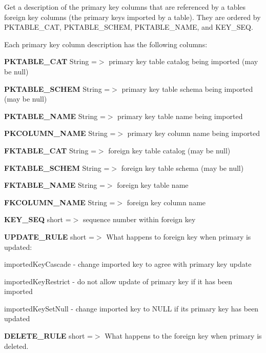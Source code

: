Get a description of the primary key columns that are referenced by a table\textquotesingle{}s foreign key columns (the primary keys imported by a table). They are ordered by P\+K\+T\+A\+B\+L\+E\+\_\+\+C\+AT, P\+K\+T\+A\+B\+L\+E\+\_\+\+S\+C\+H\+EM, P\+K\+T\+A\+B\+L\+E\+\_\+\+N\+A\+ME, and K\+E\+Y\+\_\+\+S\+EQ. 

Each primary key column description has the following columns\+: 
\begin{DoxyEnumerate}
\item {\bfseries P\+K\+T\+A\+B\+L\+E\+\_\+\+C\+AT} String =$>$ primary key table catalog being imported (may be null) 
\item {\bfseries P\+K\+T\+A\+B\+L\+E\+\_\+\+S\+C\+H\+EM} String =$>$ primary key table schema being imported (may be null) 
\item {\bfseries P\+K\+T\+A\+B\+L\+E\+\_\+\+N\+A\+ME} String =$>$ primary key table name being imported 
\item {\bfseries P\+K\+C\+O\+L\+U\+M\+N\+\_\+\+N\+A\+ME} String =$>$ primary key column name being imported 
\item {\bfseries F\+K\+T\+A\+B\+L\+E\+\_\+\+C\+AT} String =$>$ foreign key table catalog (may be null) 
\item {\bfseries F\+K\+T\+A\+B\+L\+E\+\_\+\+S\+C\+H\+EM} String =$>$ foreign key table schema (may be null) 
\item {\bfseries F\+K\+T\+A\+B\+L\+E\+\_\+\+N\+A\+ME} String =$>$ foreign key table name 
\item {\bfseries F\+K\+C\+O\+L\+U\+M\+N\+\_\+\+N\+A\+ME} String =$>$ foreign key column name 
\item {\bfseries K\+E\+Y\+\_\+\+S\+EQ} short =$>$ sequence number within foreign key 
\item {\bfseries U\+P\+D\+A\+T\+E\+\_\+\+R\+U\+LE} short =$>$ What happens to foreign key when primary is updated\+: 
\begin{DoxyItemize}
\item imported\+Key\+Cascade -\/ change imported key to agree with primary key update 
\item imported\+Key\+Restrict -\/ do not allow update of primary key if it has been imported 
\item imported\+Key\+Set\+Null -\/ change imported key to N\+U\+LL if its primary key has been updated 
\end{DoxyItemize}
\item {\bfseries D\+E\+L\+E\+T\+E\+\_\+\+R\+U\+LE} short =$>$ What happens to the foreign key when primary is deleted. 

\end{DoxyEnumerate}
